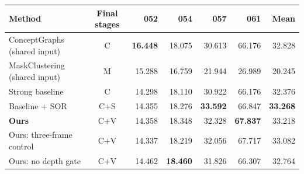 \begin{tabular}{lcrrrrr}
\toprule
Method & Final stages & 052 & 054 & 057 & 061 & Mean \\
\midrule
ConceptGraphs (shared input) & C & \textbf{16.448} & 18.075 & 30.613 & 66.176 & 32.828 \\
MaskClustering (shared input) & M & 15.288 & 16.759 & 21.944 & 26.989 & 20.245 \\
Strong baseline & C & 14.298 & 18.110 & 30.922 & 66.176 & 32.376 \\
Baseline + SOR & C+S & 14.355 & 18.276 & \textbf{33.592} & 66.847 & \textbf{33.268} \\
\rowcolor{ourstint}\textbf{Ours} & C+V & 14.358 & 18.348 & 32.328 & \textbf{67.837} & 33.218 \\
Ours: three-frame control & C+V & 14.337 & 18.219 & 32.056 & 67.717 & 33.082 \\
Ours: no depth gate & C+V & 14.462 & \textbf{18.460} & 31.826 & 66.307 & 32.764 \\
\bottomrule
\end{tabular}
